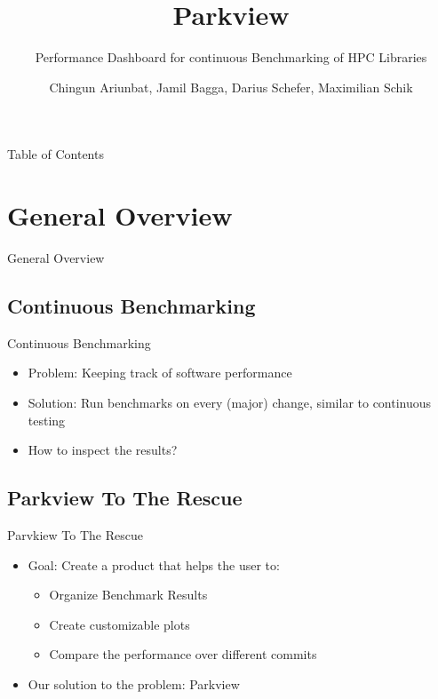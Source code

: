 \documentclass{beamer}
\title{\textcolor{nord10}{Parkview}}
\subtitle{\textcolor{nord9}{Performance Dashboard for continuous Benchmarking of HPC Libraries}}
\author{Chingun Ariunbat, Jamil Bagga, Darius Schefer, Maximilian Schik}
\begin{document}
\maketitle

\begin{frame}{Table of Contents}
  \tableofcontents
\end{frame}

\section{General Overview}
\begin{frame}
  \begin{center}
    \Huge{General Overview}
  \end{center}
\end{frame}

\subsection{Continuous Benchmarking}
\begin{frame}{Continuous Benchmarking}
  \begin{itemize}
      \item Problem: Keeping track of software performance
      \item Solution: Run benchmarks on every (major) change, similar to continuous testing
      \item How to inspect the results?
  \end{itemize}
\end{frame}

\subsection{Parkview To The Rescue}
\begin{frame}{Parvkiew To The Rescue}
  \begin{itemize}
      \item Goal: Create a product that helps the user to:
        \begin{itemize}
          \item Organize Benchmark Results
          \item Create customizable plots
          \item Compare the performance over different commits
        \end{itemize}
      \item Our solution to the problem: Parkview
  \end{itemize}
\end{frame}
\end{document}
